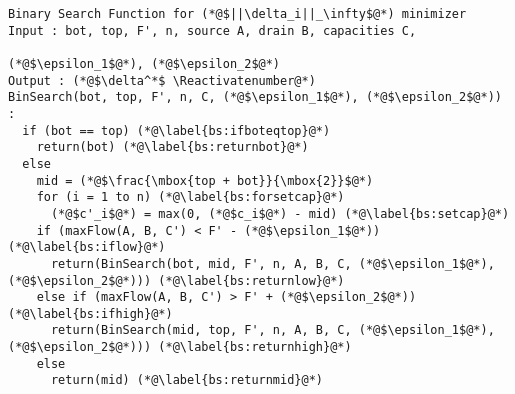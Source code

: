{}
\Suppressnumber
\begin{lstlisting}[label=binsearch, style=numbers]
Binary Search Function for (*@$||\delta_i||_\infty$@*) minimizer
Input : bot, top, F', n, source A, drain B, capacities C,
                                                      (*@$\epsilon_1$@*), (*@$\epsilon_2$@*)
Output : (*@$\delta^*$ \Reactivatenumber@*)
BinSearch(bot, top, F', n, C, (*@$\epsilon_1$@*), (*@$\epsilon_2$@*)) :
  if (bot == top) (*@\label{bs:ifboteqtop}@*)
    return(bot) (*@\label{bs:returnbot}@*)
  else
    mid = (*@$\frac{\mbox{top + bot}}{\mbox{2}}$@*)
    for (i = 1 to n) (*@\label{bs:forsetcap}@*)
      (*@$c'_i$@*) = max(0, (*@$c_i$@*) - mid) (*@\label{bs:setcap}@*)
    if (maxFlow(A, B, C') < F' - (*@$\epsilon_1$@*)) (*@\label{bs:iflow}@*)
      return(BinSearch(bot, mid, F', n, A, B, C, (*@$\epsilon_1$@*), (*@$\epsilon_2$@*))) (*@\label{bs:returnlow}@*)
    else if (maxFlow(A, B, C') > F' + (*@$\epsilon_2$@*)) (*@\label{bs:ifhigh}@*)
      return(BinSearch(mid, top, F', n, A, B, C, (*@$\epsilon_1$@*), (*@$\epsilon_2$@*))) (*@\label{bs:returnhigh}@*)
    else
      return(mid) (*@\label{bs:returnmid}@*)
\end{lstlisting}
